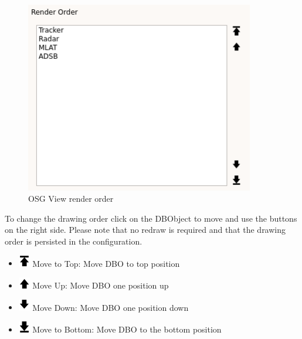 \begin{figure}[H]
    \includegraphics[width=10cm,frame]{../screenshots/osgview_render_order.png}
  \caption{OSG View render order}
\end{figure}

To change the drawing order click on the DBObject to move and use the buttons on the right side. Please note that no redraw is required and that the drawing order is persisted in the configuration.
% 
 \begin{itemize}
 \item \includegraphics[width=0.5cm]{../../data/icons/top.png} Move to Top: Move DBO to top position
 \item \includegraphics[width=0.5cm]{../../data/icons/up.png} Move Up: Move DBO one position up
 \item \includegraphics[width=0.5cm]{../../data/icons/down.png} Move Down: Move DBO one position down
 \item \includegraphics[width=0.5cm]{../../data/icons/bottom.png} Move to Bottom: Move DBO to the bottom position
\end{itemize}
